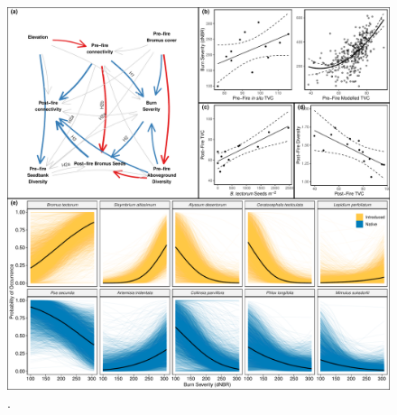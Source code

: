 \documentclass[
  12pt,
]{article}
\begin{document}
\begin{figure}
\centering
\includegraphics{images/big_plot_v2.pdf}
\caption{.}
\end{figure}
\end{document}
